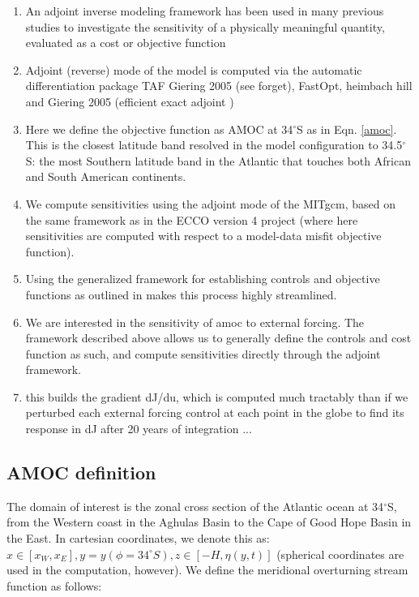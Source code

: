 \documentclass[a4paper,11pt]{article}
\begin{document}
	\begin{enumerate}
	  \item An adjoint inverse modeling framework has been used in many previous studies to investigate the sensitivity of a physically meaningful quantity, evaluated as a cost or objective function \cite{marotzke} \cite{heimbach_timescales} \cite{pillar} \cite{czeschel}
	  \item Adjoint (reverse) mode of the model is computed via the automatic differentiation package TAF Giering 2005 (see forget), FastOpt, heimbach hill and Giering 2005 (efficient exact adjoint )

	  \item Here we define the objective function as AMOC at 34$^{\circ}$S as in Eqn. \ref{amoc}. This is the closest latitude band resolved in the model configuration to 34.5$^{\circ}$S: the most Southern latitude band in the Atlantic that touches both African and South American continents. 

	  \item We compute sensitivities using the adjoint mode of the MITgcm, based on the same framework as in the ECCO version 4 project (where here sensitivities are computed with respect to a model-data misfit objective function). 
	  \item Using the generalized framework for establishing controls and objective functions as outlined in \cite{forgetECCOv4} makes this process highly streamlined.
	  \item We are interested in the sensitivity of amoc to external forcing. The framework described above allows us to generally define the controls and cost function as such, and compute sensitivities directly through the adjoint framework.
	  \item this builds the gradient dJ/du, which is computed much tractably than if we perturbed each external forcing control at each point in the globe to find its response in dJ after 20 years of integration ... 
	\end{enumerate}

  \subsection{AMOC definition}
  
    The domain of interest is the zonal cross section of the Atlantic ocean at 34$^{\circ}$S, from the Western coast in the Aghulas Basin to the Cape of Good Hope Basin in the East. In cartesian coordinates, we denote this as: $x \in [x_W,x_E], y = y(\phi=34^{\circ}S), z \in [-H,\eta(y,t)]$ (spherical coordinates are used in the computation, however).  We define the meridional overturning stream function as follows: 
    
\end{document}
